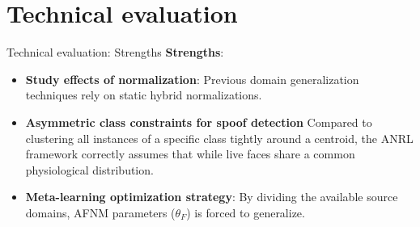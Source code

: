 \section{Technical evaluation}

\begin{frame}{Technical evaluation: Strengths}
    \textbf{Strengths}:
    \begin{itemize}
        \item \textbf{Study effects of normalization}: Previous domain generalization techniques rely on static hybrid normalizations.
        \item \textbf{Asymmetric class constraints for spoof detection} Compared to clustering all instances of a specific class tightly around a centroid, the ANRL framework correctly assumes that while live faces share a common physiological distribution.
        \item \textbf{Meta-learning optimization strategy}: By dividing the available source domains, AFNM parameters ($\theta_F$) is forced to generalize.
    \end{itemize}
\end{frame}
